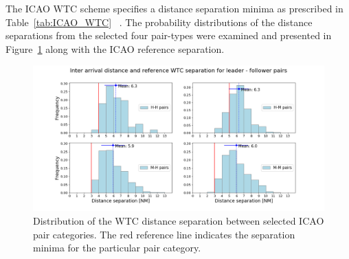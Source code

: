 The ICAO WTC scheme specifies a distance separation minima as prescribed in  Table~\ref{tab:ICAO_WTC} ~\cite{rooseleer2015recat}. The probability distributions of the distance separations from the selected four pair-types were examined and presented in Figure~\ref{fig:dist_separ_HH_HM_MH_MM_pairs} along with the ICAO reference separation.  
\begin{figure}[h]
    \centering
    \includegraphics[width=1\textwidth]{graphics/fig_dist_separ_HH_HM_MH_MM_pairs.png}
    \caption[Distribution of distance separation for ICAO pairs]{Distribution of the WTC distance separation between selected ICAO pair categories. The red reference line indicates the separation minima for the particular pair category.}
    \label{fig:dist_separ_HH_HM_MH_MM_pairs}
\end{figure}

